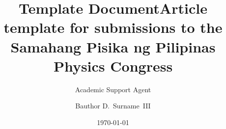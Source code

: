 \documentclass{article}
\title{Template Document}
\author{Academic Support Agent}
\date{\today}
\begin{document}
\maketitle

\title{\TitleFont Article template for submissions to the Samahang Pisika ng Pilipinas Physics Congress}


\author[ ]{Bauthor D.~Surname~III
\lastauthorsep}



\end{document}
